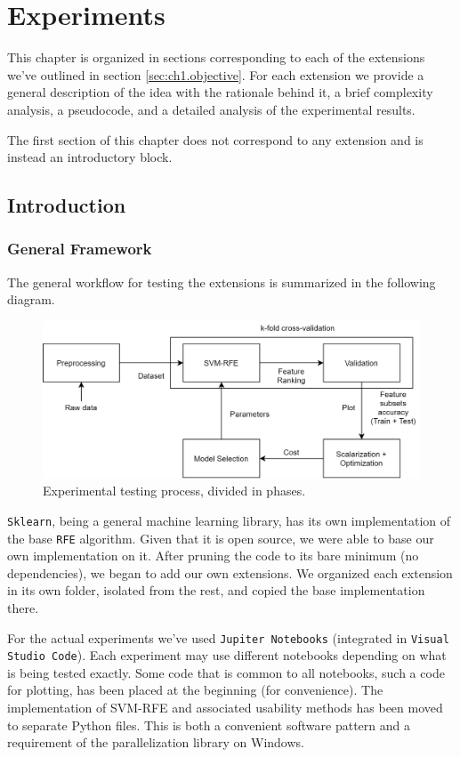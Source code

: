 \chapter{Experiments}
\label{Chapter5}

This chapter is organized in sections corresponding to each of the extensions we've outlined in section \ref{sec:ch1.objective}. For each extension we provide a general description of the idea with the rationale behind it, a brief complexity analysis, a pseudocode, and a detailed analysis of the experimental results.

The first section of this chapter does not correspond to any extension and is instead an introductory block.

\section{Introduction}

\subsection{General Framework}

The general workflow for testing the extensions is summarized in the following diagram.

\begin{figure}[h]
    \centering
    \includegraphics[width=0.8\linewidth]{img/ch5/diag.png}
    \caption{Experimental testing process, divided in phases.}
    \label{fig:ch5.diag}
\end{figure}

\texttt{Sklearn}, being a general machine learning library, has its own implementation of the base \texttt{RFE} algorithm. Given that it is open source, we were able to base our own implementation on it. After pruning the code to its bare minimum (no dep\-en\-den\-cies), we began to add our own extensions. We organized each extension in its own folder, isolated from the rest, and copied the base implementation there.

For the actual experiments we've used \texttt{Jupiter Notebooks} (integrated in \texttt{Visual Studio Code}). Each experiment may use different notebooks depending on what is being tested exactly. Some code that is common to all notebooks, such a code for plotting, has been placed at the beginning (for convenience). The implementation of SVM-RFE and associated usability methods has been moved to separate Python files. This is both a convenient software pattern and a requirement of the parallelization library on Windows.

